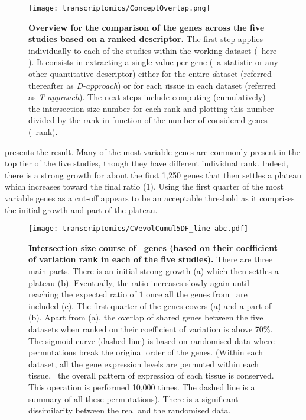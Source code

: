 \begin{figure}[!htpb]
    \texttt{[image: transcriptomics/ConceptOverlap.png]}\centering
    \caption[Overview for the comparison of the genes across the five
    studies based on a ranked descriptor 5 studies]{\label{fig:overlapConcept}%
    \textbf{Overview for the comparison of the genes across the five
    studies based on a ranked descriptor.}
    The first step applies individually to each of the studies
    within the working dataset (\ie\ here \setOne).
    It consists in extracting a single value per gene
    (\eg\ a statistic or any other quantitative descriptor)
    either for the entire \emph{d}ataset (referred thereafter as \emph{D-approach}) or
    for each \emph{t}issue in each dataset (referred as \emph{T-approach}).
    The next steps include
    computing (cumulatively) the intersection size number for each rank
    and plotting this number divided by the rank
    in function of the number of considered genes (\ie\ rank).}
\end{figure}

 presents the result.
Many of the most variable genes are commonly present in the top tier of the
five studies, though they have different individual rank.
Indeed, there is a strong growth for about the first 1,250 genes that then
settles a plateau which increases toward the final ratio ($1$).
Using the first quarter of the most variable genes as a cut-off appears
to be an acceptable threshold
as it comprises the initial growth and part of the plateau.

\begin{figure}[!ht]
    \texttt{[image: transcriptomics/CVevolCumul5DF\_line-abc.pdf]}\centering
    \caption[Intersection size of \setOne\ genes (ranked by cv)]%
    {\label{fig:cvEvol5DF}\textbf{Intersection size course
    of \setOne\ genes (based on their coefficient of variation rank
    in each of the five studies).}
    There are three main parts.
    There is an initial strong growth (a)
    which then settles a plateau (b).
    Eventually, the ratio increases slowly again
    until reaching the expected ratio of $1$ once all the genes from \setOne\
    are included (c).
    The first quarter of the genes covers (a) and a part of (b).
    Apart from (a),
    the overlap of shared genes between the five datasets when ranked on their
    coefficient of variation is above 70\%.
    The sigmoid curve (dashed line) is based on randomised data
    where permutations break the original order of the genes. (Within each dataset,
    all the gene expression levels are permuted within each tissue,
    \ie\ the overall pattern of expression of each tissue is conserved.
    This operation is performed 10,000 times.
    The dashed line is a summary of all these permutations).
    There is a significant dissimilarity between the real and the randomised data.}
\end{figure}

